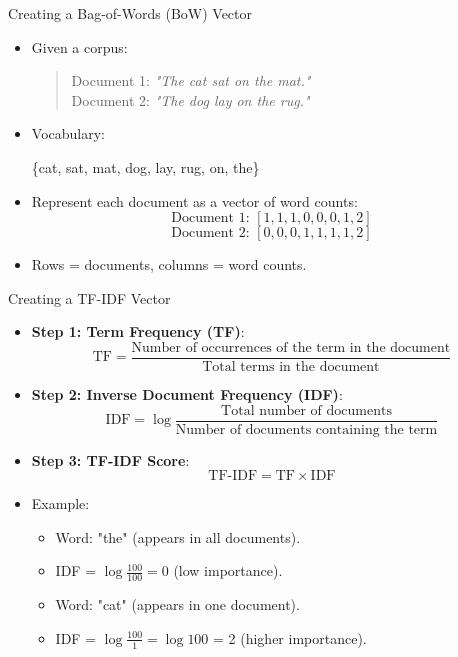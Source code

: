 \documentclass{beamer}
\begin{document}
\begin{frame}{Creating a Bag-of-Words (BoW) Vector}
    \begin{itemize}
        \item Given a corpus:
        \begin{quote}
            Document 1: \textit{"The cat sat on the mat."} \\
            Document 2: \textit{"The dog lay on the rug."}
        \end{quote}
        \item Vocabulary:
        \begin{center}
            \{cat, sat, mat, dog, lay, rug, on, the\}
        \end{center}
        \item Represent each document as a vector of word counts:
        \[
        \text{Document 1: } [1, 1, 1, 0, 0, 0, 1, 2]
        \]
        \[
        \text{Document 2: } [0, 0, 0, 1, 1, 1, 1, 2]
        \]
        \item Rows = documents, columns = word counts.
    \end{itemize}
\end{frame}

\begin{frame}{Creating a TF-IDF Vector}
    \begin{itemize}
        \item \textbf{Step 1: Term Frequency (TF)}:
        \[
        \text{TF} = \frac{\text{Number of occurrences of the term in the document}}{\text{Total terms in the document}}
        \]
        \item \textbf{Step 2: Inverse Document Frequency (IDF)}:
        \[
        \text{IDF} = \log \frac{\text{Total number of documents}}{\text{Number of documents containing the term}}
        \]
        \item \textbf{Step 3: TF-IDF Score}:
        \[
        \text{TF-IDF} = \text{TF} \times \text{IDF}
        \]
        \item Example:
        \begin{itemize}
            \item Word: "the" (appears in all documents).
            \item IDF = $\log \frac{100}{100} = 0$ (low importance).
            \item Word: "cat" (appears in one document).
            \item IDF = $\log \frac{100}{1} = \log 100$ = 2 (higher importance).
        \end{itemize}
    \end{itemize}
\end{frame}
\end{document}

